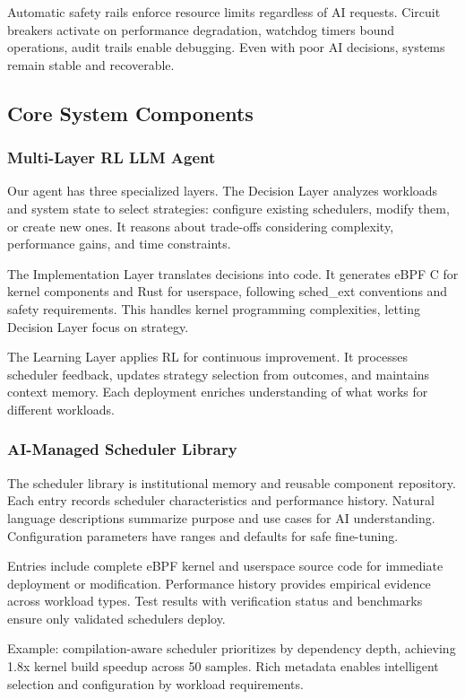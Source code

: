 Automatic safety rails enforce resource limits regardless of AI requests. Circuit breakers activate on performance degradation, watchdog timers bound operations, audit trails enable debugging. Even with poor AI decisions, systems remain stable and recoverable.

\subsection{Core System Components}

\subsubsection{Multi-Layer RL LLM Agent}
Our agent has three specialized layers. The Decision Layer analyzes workloads and system state to select strategies: configure existing schedulers, modify them, or create new ones. It reasons about trade-offs considering complexity, performance gains, and time constraints.

The Implementation Layer translates decisions into code. It generates eBPF C for kernel components and Rust for userspace, following sched\_ext conventions and safety requirements. This handles kernel programming complexities, letting Decision Layer focus on strategy.

The Learning Layer applies RL for continuous improvement. It processes scheduler feedback, updates strategy selection from outcomes, and maintains context memory. Each deployment enriches understanding of what works for different workloads.

\subsubsection{AI-Managed Scheduler Library}
The scheduler library is institutional memory and reusable component repository. Each entry records scheduler characteristics and performance history. Natural language descriptions summarize purpose and use cases for AI understanding. Configuration parameters have ranges and defaults for safe fine-tuning.

Entries include complete eBPF kernel and userspace source code for immediate deployment or modification. Performance history provides empirical evidence across workload types. Test results with verification status and benchmarks ensure only validated schedulers deploy.

Example: compilation-aware scheduler prioritizes by dependency depth, achieving 1.8x kernel build speedup across 50 samples. Rich metadata enables intelligent selection and configuration by workload requirements.

